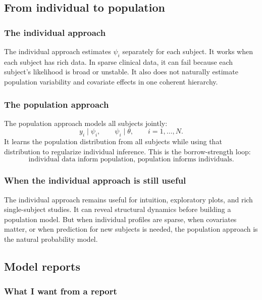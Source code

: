 \subsection{From individual to population}

\subsubsection*{The individual approach}

The individual approach estimates \(\psi_i\) separately for each subject.  It works when each subject has rich data.  In sparse clinical data, it can fail because each subject's likelihood is broad or unstable.  It also does not naturally estimate population variability and covariate effects in one coherent hierarchy.

\subsubsection*{The population approach}

The population approach models all subjects jointly:
\[
  y_i\mid\psi_i,
  \qquad
  \psi_i\mid\theta,
  \qquad
  i=1,\ldots,N.
\]
It learns the population distribution from all subjects while using that distribution to regularize individual inference.  This is the borrow-strength loop:
\[
  \text{individual data inform population, population informs individuals.}
\]

\subsubsection*{When the individual approach is still useful}

The individual approach remains useful for intuition, exploratory plots, and rich single-subject studies.  It can reveal structural dynamics before building a population model.  But when individual profiles are sparse, when covariates matter, or when prediction for new subjects is needed, the population approach is the natural probability model.

\subsection{Model reports}

\subsubsection*{What I want from a report}

